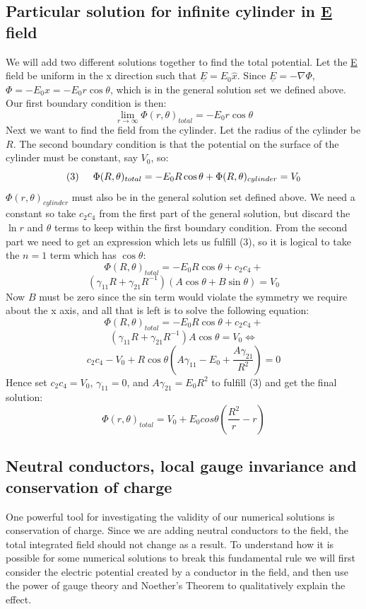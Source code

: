 \documentclass[aps,twocolumn,pre,nofootinbib]{revtex4-1}
\begin{document}
\subsection*{Particular solution for infinite cylinder in \underline{E} field}
We will add two different solutions together to find the total potential. Let the \underline{E} field be uniform in the x direction
such that $\underline{E} = E_0 \hat{x}$. Since $\underline{E} = - \nabla \Phi$, $\Phi = -E_0 x = -E_0 r \cos\theta$, which is
in the general solution set we defined above.
Our first
boundary condition is then:
\[ \lim_{r \rightarrow \infty} \Phi(r,\theta)_{total} = -E_0 r \cos\theta \]
Next we want to find the field from the cylinder. Let the radius of the cylinder be $R$.
The second boundary condition is that the potential on the surface of the cylinder must be constant,
say $V_0$, so:
\[ (3) \hspace{0.5cm} \Phi(R,\theta)_{total} = -E_0 R \cos\theta + \Phi(R,\theta)_{cylinder} = V_0 \]
$\Phi(r,\theta)_{cylinder}$ must also be in the general solution set defined above. We need a constant so take $c_2 c_4$ from the first
part of the general solution, but discard the
$\ln r$ and $\theta$ terms to keep within the first boundary condition.
From the second part we need to get an expression which lets us fulfill (3), so it is logical to take the $n = 1$ term which has $\cos\theta$:
\[ \Phi(R,\theta)_{total} = -E_0 R \cos\theta +  c_2 c_4 + \]
\[(\gamma_{11} R + \gamma_{21} R^{-1}) (A\cos\theta + B \sin\theta) = V_0 \]
Now $B$ must be zero since the sin term would violate the symmetry we require about the x axis, and all that is left is to solve the following equation:
\[ \Phi(R,\theta)_{total} = -E_0 R \cos\theta + c_2 c_4 + \]
\[(\gamma_{11} R + \gamma_{21} R^{-1}) A\cos\theta = V_0 \Leftrightarrow \]
\[ c_2 c_4 - V_0 + R \cos\theta \left( A\gamma_{11} - E_0 + \frac{A\gamma_{21}}{R^2} \right) = 0 \]
Hence set $c_2 c_4 = V_0$, $\gamma_{11} = 0$, and $A\gamma_{21} = E_0 R^2$ to fulfill (3) and get the final solution:
\[ \Phi(r,\theta)_{total} = V_0 + E_0 cos\theta \left( \frac{R^2}{r} - r \right) \]

\subsection*{Neutral conductors, local gauge invariance and conservation of charge}

One powerful tool for investigating the validity of our numerical solutions is conservation of charge. Since we are adding neutral conductors to the field, the total integrated field should not change as a result. To understand how it is possible for some numerical solutions to break this fundamental rule we will first consider the electric potential created by a conductor in the field, and then use the power of gauge theory and Noether's Theorem to qualitatively explain the effect.
\end{document}
